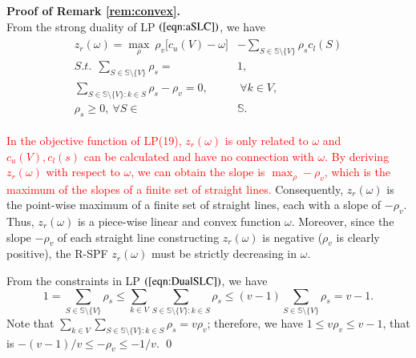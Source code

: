 \documentclass[authoryear,review,12pt]{elsarticle}
\begin{document}
\noindent \textbf{Proof of Remark \ref{rem:convex}.}\\
From the strong duality of LP $(\ref{eqn:aSLC})$, we have
\begin{eqnarray}\label{eqn:DualSLC}
\begin{aligned}
z_r(\omega) = \max_{\rho}~ \rho_v \big[ c_u(V)-\omega \big] &- \sum_{S \in \mathbb{S} \setminus \{V\}} \rho_s c_l(S)\\
S.t.~~\sum_{S \in \mathbb{S} \setminus \{V\}} \rho_s = &1,\\
\sum_{S \in \mathbb{S} \setminus \{V\}: k \in S} \rho_s - \rho_v = 0,&~\forall k \in V,\\
\rho_s \geq 0,~\forall S \in& \mathbb{S}.
\end{aligned}
\end{eqnarray}

\textcolor{red}{In the objective function of LP(19), $z_r(\omega)$ is only related to $\omega$ and $c_u(V), c_l(s)$ can be calculated and have no connection with $\omega$. By deriving $z_r(\omega)$ with respect to $\omega$, we can obtain the slope is $\max_\rho -\rho_v$, which is the maximum of the slopes of a finite set of straight lines.}
Consequently, $z_r(\omega)$ is the point-wise maximum of a finite set of straight lines, each with a slope of $-\rho_v$.
Thus, $z_r(\omega)$ is a piece-wise linear and convex function  $\omega$.
Moreover, since the slope $-\rho_v$ of each straight line constructing $z_r(\omega)$ is negative ($\rho_v$ is clearly positive), the R-SPF $z_r(\omega)$ must be strictly decreasing in $\omega$.

From the constraints in LP $(\ref{eqn:DualSLC})$, we have
$$
1 = \sum_{S \in \mathbb{S} \setminus \{V\}} \rho_s \leq \sum_{k \in V}\sum_{S \in \mathbb{S} \setminus \{V\}: k \in S} \rho_s \leq (v-1)\sum_{S \in \mathbb{S} \setminus \{V\}} \rho_s = v-1.
$$
Note that $\sum_{k \in V}\sum_{S \in \mathbb{S} \setminus \{V\}: k \in S} \rho_s = v\rho_v$; therefore, we have $1 \leq v\rho_v \leq v-1$, that is $-(v-1)/v\leq -\rho_v \leq -1/v$.
\qed
\end{document}
